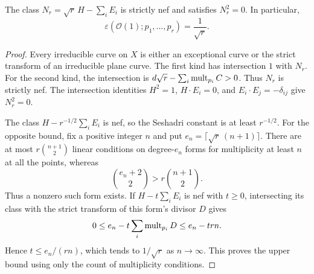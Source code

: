 \begin{corollary}\label{cor:sesha}
The class $N_r=\sqrt r\,H-\sum_iE_i$ is strictly nef and satisfies
$N_r^2=0$. In particular,
\[
 \varepsilon(\mathcal O(1);p_1,\ldots,p_r)=\frac1{\sqrt r}.
\]
\end{corollary}
\begin{proof}
Every irreducible curve on $X$ is either an exceptional curve or the
strict transform of an irreducible plane curve. The first kind has
intersection $1$ with $N_r$. For the second kind, the intersection is
$d\sqrt r-\sum_i\operatorname{mult}_{p_i}C>0$. Thus $N_r$ is strictly nef.
The intersection identities $H^2=1$, $H\cdot E_i=0$, and
$E_i\cdot E_j=-\delta_{ij}$ give $N_r^2=0$.

The class $H-r^{-1/2}\sum_iE_i$ is nef, so the Seshadri constant is
at least $r^{-1/2}$. For the opposite bound, fix a positive integer $n$ and put
$e_n=\lceil\sqrt r\,(n+1)\rceil$. There are at most
$r\binom{n+1}{2}$ linear conditions on degree-$e_n$ forms for
multiplicity at least $n$ at all the points, whereas
\[
 \binom{e_n+2}{2}>r\binom{n+1}{2}.
\]
Thus a nonzero such form exists. If $H-t\sum_iE_i$ is nef with
$t\ge0$, intersecting its class with the strict transform of this
form's divisor $D$ gives
\[
 0\le e_n-t\sum_i\operatorname{mult}_{p_i}D\le e_n-trn.
\]
Hence
$t\le e_n/(rn)$, which tends to $1/\sqrt r$ as $n\to\infty$.
This proves the upper bound using only the count of multiplicity
conditions.
\end{proof}
